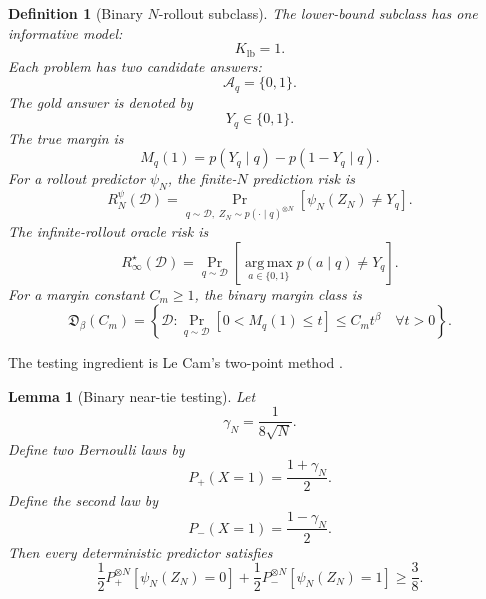 \documentclass{article} %
\newtheorem{lemma}[theorem]{Lemma}
\newtheorem{definition}{Definition}
\providecommand{\argmax}{\mathop{\mathrm{arg\,max}}\limits}
\providecommand{\D}{\mathcal{D}}
\providecommand{\Risk}{R}
\begin{document}
\begin{definition}[Binary \(N\)-rollout subclass]
\label{def:app3-binary}
The lower-bound subclass has one informative model:
\begin{equation}
\label{eq:app3-Klb}
K_{\mathrm{lb}}=1.
\end{equation}
Each problem has two candidate answers:
\begin{equation}
\label{eq:app3-Alb}
\mathcal A_q=\{0,1\}.
\end{equation}
The gold answer is denoted by
\begin{equation}
\label{eq:app3-gold}
Y_q\in\{0,1\}.
\end{equation}
The true margin is
\begin{equation}
\label{eq:app3-margin}
M_q(1)=p(Y_q\mid q)-p(1-Y_q\mid q).
\end{equation}
For a rollout predictor \(\psi_N\), the finite-\(N\) prediction risk is
\begin{equation}
\label{eq:app3-riskNpsi}
\Risk_N^\psi(\D)
=
\Pr_{q\sim\D,\;Z_N\sim p(\cdot\mid q)^{\otimes N}}
\!\left[\psi_N(Z_N)\ne Y_q\right].
\end{equation}
The infinite-rollout oracle risk is
\begin{equation}
\label{eq:app3-riskinf}
\Risk_\infty^\star(\D)
=
\Pr_{q\sim\D}
\!\left[
\argmax_{a\in\{0,1\}}p(a\mid q)\ne Y_q
\right].
\end{equation}
For a margin constant \(C_m\ge 1\), the binary margin class is
\begin{equation}
\label{eq:app3-class}
\mathfrak D_\beta(C_m)
=
\left\{
\D:
\Pr_{q\sim\D}\!\left[0<M_q(1)\le t\right]
\le
C_m t^\beta
\quad
\forall t>0
\right\}.
\end{equation}
\end{definition}

The testing ingredient is Le Cam's two-point method
\cite{tsybakov2009introduction}.

\begin{lemma}[Binary near-tie testing]
\label{lem:6}
Let
\begin{equation}
\label{eq:lem6-gamma}
\gamma_N=\frac{1}{8\sqrt N}.
\end{equation}
Define two Bernoulli laws by
\begin{equation}
\label{eq:lem6-Pplus}
P_+(X=1)=\frac{1+\gamma_N}{2}.
\end{equation}
Define the second law by
\begin{equation}
\label{eq:lem6-Pminus}
P_-(X=1)=\frac{1-\gamma_N}{2}.
\end{equation}
Then every deterministic predictor satisfies
\begin{equation}
\label{eq:lem6-testing}
\frac12 P_+^{\otimes N}\!\left[\psi_N(Z_N)=0\right]
+
\frac12 P_-^{\otimes N}\!\left[\psi_N(Z_N)=1\right]
\ge
\frac{3}{8}.
\end{equation}
\end{lemma}
\end{document}
